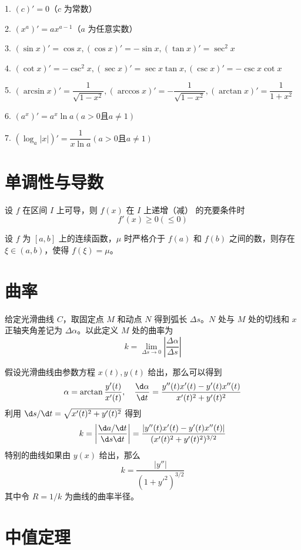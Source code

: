 1. $(c)' = 0$（$c$ 为常数）

2. $(x^a)' = ax^{a-1}$（$a$ 为任意实数）

3. $(\sin x)' = \cos x,(\cos x)'=-\sin x,(\tan x)'=\sec^2x$

4. $(\cot x)' = -\csc^2 x,(\sec x)'=\sec x \tan x,(\csc x)'=-\csc x \cot x$

5. $(\arcsin x)'=\dfrac{1}{\sqrt{1-x^2}},(\arccos x)' = -\dfrac{1}{\sqrt{1-x^2}},(\arctan x)'=\dfrac{1}{1+x^2}$

6. $(a^x)'=a^x \ln a(a>0\text{且}a\ne 1)$

7. $(\log_a|x|)'=\dfrac{1}{x\ln a}(a>0\text{且}a\ne 1)$

\section{单调性与导数}

\begin{theorem}
	设 $f$ 在区间 $I$ 上可导，则 $f(x)$ 在 $I$ 上递增（减） 的充要条件时
	\[ f'(x) \geqslant 0(\leqslant 0) \]
\end{theorem}

\begin{theorem}[介值定理]
	设 $f$ 为 $[a,b]$ 上的连续函数，$\mu$ 时严格介于 $f(a)$ 和 $f(b)$ 之间的数，则存在 $\xi\in (a,b)$，使得 $f(\xi)=\mu$。
\end{theorem}

\section{曲率}

给定光滑曲线 $C$，取固定点 $M$ 和动点 $N$ 得到弧长 $\Delta s$。$N$ 处与 $M$ 处的切线和 $x$ 正轴夹角差记为 $\Delta \alpha$。以此定义 $M$ 处的曲率为
\[ k = \lim_{\Delta s \to 0} \left| \frac{\Delta \alpha}{\Delta s} \right| \]

假设光滑曲线由参数方程 $x(t), y(t)$ 给出，那么可以得到
\[ \alpha = \arctan \frac{y'(t)}{x'(t)}, \quad \frac{\d \alpha}{\d t} = \frac{y''(t)x'(t) - y'(t) x''(t)}{x'(t)^2 + y'(t)^2} \]
利用 $\d s/ \d t = \sqrt{x'(t)^2 + y'(t)^2}$ 得到
\[ k = \left| \frac{\d a / \d t}{\d s \d t} \right| = \frac{|y''(t)x'(t) - y'(t) x''(t)|}{(x'(t)^2 + y'(t)^2)^{3/2}} \]
特别的曲线如果由 $y(x)$ 给出，那么
\[ k = \frac{|y''|}{(1+y'^2)^{3/2}} \]
其中令 $R = 1/k$ 为曲线的曲率半径。

\section{中值定理}


